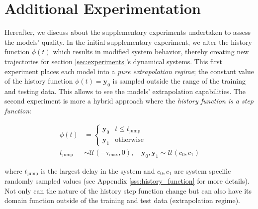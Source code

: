 \documentclass[pmlr]{jmlr}%
\begin{document}
\section{Additional Experimentation}\label{ap:step_history_experiments}
Hereafter, we discuss about the supplementary experiments undertaken to assess the models' quality. In the initial supplementary experiment, we alter the history function $\phi(t)$ which results in modified system behavior, thereby creating new trajectories for section \ref{sec:experiments}'s dynamical systems. This first experiment places each model into a \textit{pure extrapolation regime}; the constant value of the history function $\phi(t)=\mathbf{y}_0$ is sampled outside the range of the training and testing data. This allows to see the models' extrapolation capabilities. The second experiment is more a hybrid approach where the \textit{history function is a step function}:

\begin{equation*}
\begin{aligned}
\phi(t) &= \begin{cases} 
      \mathbf{y}_0 & t\leq t_{\text{jump}} \\
      \mathbf{y}_1 & \text{otherwise}
   \end{cases} \\
t_{\text{jump}} &\sim \mathcal{U}(-\tau_{\text{max}}, 0), \quad \mathbf{y}_0, \mathbf{y}_1 \sim \mathcal{U}(c_0, c_1)
\end{aligned}
\end{equation*}

where $t_{\text{jump}}$ is the largest delay in the system and $c_0, c_1$ are system specific randomly sampled values (see Appendix \ref{sss:history_function} for more details). Not only can the nature of the history step function change but can also have its domain function outside of the training and test data (extrapolation regime).


\end{document}
